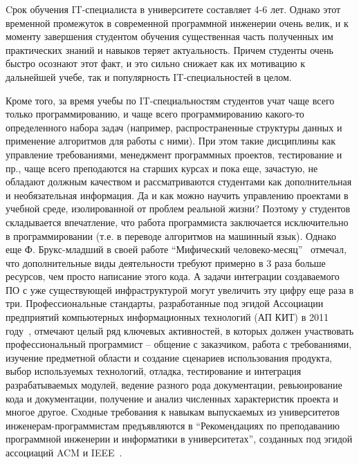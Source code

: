 \documentclass[a5paper]{article}
\begin{document}
Cрок обучения IT-специалиста в университете составляет 4-6 лет. Однако этот временной промежуток  в современной программной инженерии очень велик, и к моменту завершения студентом обучения существенная часть полученных им практических знаний и навыков теряет актуальность. Причем студенты очень быстро осознают этот факт, и это сильно снижает как их мотивацию к дальнейшей учебе, так и популярность IT-специальностей в целом. 

Кроме того, за время учебы по IT-специальностям студентов учат чаще всего только программированию, и чаще всего программированию  какого-то определенного набора задач (например, распространенные структуры данных и применение алгоритмов для работы с ними). При этом такие дисциплины как управление требованиями, менеджмент программных проектов, тестирование и пр., чаще всего преподаются на старших курсах и пока еще, зачастую, не обладают должным качеством и рассматриваются студентами как дополнительная и необязательная информация. Да и как можно научить управлению проектами в учебной среде, изолированной от проблем реальной жизни? Поэтому у студентов складывается впечатление, что работа программиста заключается исключительно в программировании  (т.е. в переводе алгоритмов на машинный язык). Однако еще Ф. Брукс-младший в своей работе ``Мифический человеко-месяц''~\cite{brooks} отмечал, что дополнительные виды деятельности требуют примерно в 3 раза больше ресурсов, чем просто написание этого кода. А задачи интеграции создаваемого ПО с уже существующей инфраструктурой могут увеличить эту цифру еще раза в три. Профессиональные стандарты, разработанные под эгидой Ассоциации предприятий компьютерных информационных технологий (АП КИТ) в 2011 году~\cite{apkit},  отмечают целый ряд ключевых активностей, в которых должен участвовать профессиональный программист -- общение с заказчиком, работа с требованиями, изучение предметной области и создание сценариев использования продукта, выбор используемых технологий, отладка, тестирование и интеграция разрабатываемых модулей, ведение разного рода документации, ревьюирование кода и документации, получение и анализ численных характеристик проекта и многое другое. Сходные требования к навыкам  выпускаемых из университетов инженерам-программистам предъявляются в ``Рекомендациях по преподаванию программной инженерии и информатики в университетах'', созданных под эгидой ассоциаций ACM и  IEEE~\cite{curriculum, terekhov2}. 
\end{document}
